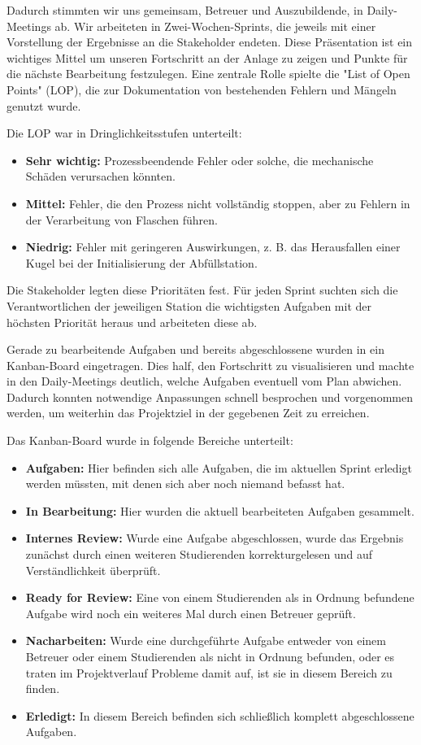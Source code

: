 Dadurch stimmten wir uns gemeinsam, Betreuer und Auszubildende, in Daily-Meetings ab. Wir arbeiteten in Zwei-Wochen-Sprints, die jeweils mit einer Vorstellung der 
Ergebnisse an die Stakeholder endeten. Diese Präsentation ist ein wichtiges Mittel um unseren Fortschritt an der Anlage zu zeigen und Punkte für die nächste 
Bearbeitung festzulegen. Eine zentrale Rolle spielte die "List of Open Points" (LOP), die zur Dokumentation 
von bestehenden Fehlern und Mängeln genutzt wurde.

Die LOP war in Dringlichkeitsstufen unterteilt:
\begin{itemize}
    \item \textbf{Sehr wichtig:} Prozessbeendende Fehler oder solche, die mechanische Schäden verursachen könnten.
    \item \textbf{Mittel:} Fehler, die den Prozess nicht vollständig stoppen, aber zu Fehlern in der Verarbeitung von Flaschen führen.
    \item \textbf{Niedrig:} Fehler mit geringeren Auswirkungen, z. B. das Herausfallen einer Kugel bei der Initialisierung der Abfüllstation.
\end{itemize}


Die Stakeholder legten diese Prioritäten fest. Für jeden Sprint suchten sich die Verantwortlichen der jeweiligen Station 
die wichtigsten Aufgaben mit der höchsten Priorität heraus und arbeiteten diese ab.  

Gerade zu bearbeitende Aufgaben und bereits abgeschlossene wurden in ein Kanban-Board eingetragen. Dies half, den Fortschritt 
zu visualisieren und machte in den Daily-Meetings deutlich, welche Aufgaben eventuell vom Plan abwichen. Dadurch konnten 
notwendige Anpassungen schnell besprochen und vorgenommen werden, um weiterhin das Projektziel in der gegebenen Zeit zu 
erreichen.  

Das Kanban-Board wurde in folgende Bereiche unterteilt:
\begin{itemize}
    \item \textbf{Aufgaben:} Hier befinden sich alle Aufgaben, die im aktuellen Sprint erledigt werden müssten, mit denen 
    sich aber noch niemand befasst hat.
    \item \textbf{In Bearbeitung:} Hier wurden die aktuell bearbeiteten Aufgaben gesammelt.
    \item \textbf{Internes Review:} Wurde eine Aufgabe abgeschlossen, wurde das Ergebnis zunächst durch einen weiteren 
    Studierenden korrekturgelesen und auf Verständlichkeit überprüft.
    \item \textbf{Ready for Review:} Eine von einem Studierenden als in Ordnung befundene Aufgabe wird noch ein weiteres 
    Mal durch einen Betreuer geprüft.
    \item \textbf{Nacharbeiten:} Wurde eine durchgeführte Aufgabe entweder von einem Betreuer oder einem Studierenden als 
    nicht in Ordnung befunden, oder es traten im Projektverlauf Probleme damit auf, ist sie in diesem Bereich zu finden.
    \item \textbf{Erledigt:} In diesem Bereich befinden sich schließlich komplett abgeschlossene Aufgaben.
\end{itemize}

